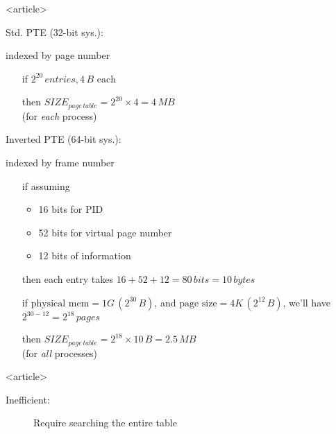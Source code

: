 \begin{frame}<article>%
  \begin{minipage}[t]{.39\linewidth}
    Std. PTE (32-bit sys.):
    \begin{center}

      \scriptsize{indexed by page number}
    \end{center}
    \begin{itemize}
    \item[if] $2^{20}\,entries, 4\,B\text{ each}$
    \item[then] $SIZE_{page\,table}=2^{20}\times{}4 = 4\,MB$ \\(for \emph{each} process)
    \end{itemize}
  \end{minipage}
  \hfill
  \begin{minipage}[t]{.58\linewidth}
    Inverted PTE (64-bit sys.):
    \begin{center}

      \scriptsize{indexed by frame number}
    \end{center}
    \begin{itemize}
    \item[if] assuming
      \begin{itemize}
      \item 16 bits for PID
      \item 52 bits for virtual page number
      \item 12 bits of information
      \end{itemize}
    \item[then] each entry takes $16 + 52 + 12 = 80\,bits = 10\,bytes$
    \item[if] $\text{physical mem}=1G\,(2^{30}\,B)$, and $\text{page
        size}=4K\,(2^{12}\,B)$, we'll have $2^{30-12} = 2^{18}\,pages$
    \item[then] $SIZE_{page\,table}=2^{18}\times{}10\,B=2.5\,MB$ \\(for \emph{all}
      processes)
    \end{itemize}
  \end{minipage}
\end{frame}

\begin{frame}<article>
  \begin{description}
  \item[Inefficient:] Require searching the entire table 
  \end{description}
  \begin{center}
  \end{center}
\end{frame}

